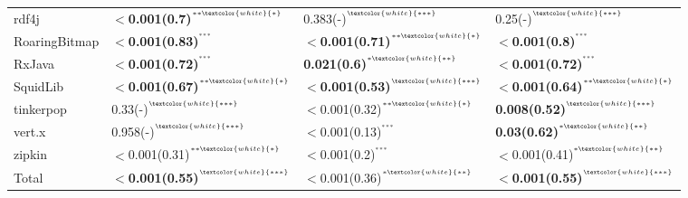 \begin{tabular}{llll}
rdf4j               &  \textbf{$<$0.001(0.7)}\tiny{$^{^{**\textcolor{white}{*}}}$} &  0.383(-)\tiny{$^{^{\textcolor{white}{***}}}$} &  0.25(-)\tiny{$^{^{\textcolor{white}{***}}}$} \\
RoaringBitmap       &  \textbf{$<$0.001(0.83)}\tiny{$^{^{***}}$} &  \textbf{$<$0.001(0.71)}\tiny{$^{^{**\textcolor{white}{*}}}$} &  \textbf{$<$0.001(0.8)}\tiny{$^{^{***}}$} \\
RxJava              &  \textbf{$<$0.001(0.72)}\tiny{$^{^{***}}$} &  \textbf{0.021(0.6)}\tiny{$^{^{*\textcolor{white}{**}}}$} &  \textbf{$<$0.001(0.72)}\tiny{$^{^{***}}$} \\
SquidLib            &  \textbf{$<$0.001(0.67)}\tiny{$^{^{**\textcolor{white}{*}}}$} &  \textbf{$<$0.001(0.53)}\tiny{$^{^{\textcolor{white}{***}}}$} &  \textbf{$<$0.001(0.64)}\tiny{$^{^{**\textcolor{white}{*}}}$} \\
tinkerpop           &  0.33(-)\tiny{$^{^{\textcolor{white}{***}}}$} &  $<$0.001(0.32)\tiny{$^{^{**\textcolor{white}{*}}}$} &  \textbf{0.008(0.52)}\tiny{$^{^{\textcolor{white}{***}}}$} \\
vert.x              &  0.958(-)\tiny{$^{^{\textcolor{white}{***}}}$} &  $<$0.001(0.13)\tiny{$^{^{***}}$} &  \textbf{0.03(0.62)}\tiny{$^{^{*\textcolor{white}{**}}}$} \\
zipkin              &  $<$0.001(0.31)\tiny{$^{^{**\textcolor{white}{*}}}$} &  $<$0.001(0.2)\tiny{$^{^{***}}$} &  $<$0.001(0.41)\tiny{$^{^{*\textcolor{white}{**}}}$} \\
Total               &  \textbf{$<$0.001(0.55)}\tiny{$^{^{\textcolor{white}{***}}}$} &  $<$0.001(0.36)\tiny{$^{^{*\textcolor{white}{**}}}$} &  \textbf{$<$0.001(0.55)}\tiny{$^{^{\textcolor{white}{***}}}$} \\
\bottomrule
\end{tabular}
